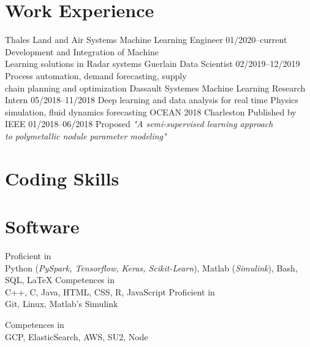 \documentclass[]{source}
\begin{document}
\section{Work Experience} 
\begin{entrylist}
\medskip
\entry
{\footnotesize{Thales Land and Air Systems}}
{Machine Learning Engineer}
{01/2020–current}
{Development and Integration of Machine \\
Learning solutions in Radar systems}
\medskip
\entry
{\footnotesize{Guerlain}}
{Data Scientist}
{02/2019–12/2019}
{Process automation, demand forecasting, supply \\
chain planning and optimization}
\medskip
\entry
{\footnotesize{Dassault Systemes}}
{Machine Learning Research Intern}
{05/2018–11/2018}
{Deep learning and data analysis for real time Physics\\
simulation, fluid dynamics forecasting}
\entry
{\footnotesize{OCEAN 2018 Charleston}}
{Published by IEEE}
{01/2018–06/2018}
{Proposed \textit{"A semi-supervised learning approach\\
 to polymetallic nodule parameter modeling"}}
\end{entrylist}
\vspace{0.2cm}
\begin{multicols}{2}
\section{Coding Skills}
\section{Software}
\end{multicols}
\begin{multicols}{2}
\parskip
Proficient in\\
Python (\textit{PySpark, Tensorflow, Keras,
Scikit-Learn}),
Matlab (\textit{Simulink}),
Bash, SQL, \LaTeX 
\vspace{0.3cm}
Competences in \\
C++, C, Java,
HTML, CSS, R, 
JavaScript
\parskip
Proficient in\\
Git, Linux, Matlab's Simulink
\vspace{0.7cm}

Competences in \\
GCP, ElasticSearch, AWS, SU2, Node
\vspace{0.3cm}

\end{multicols}
\end{document}
